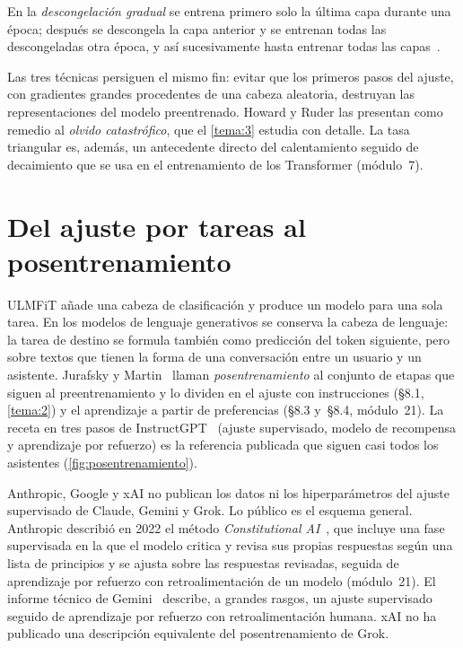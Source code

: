 \begin{definicion}\label{def:descongelacion}
En la \emph{descongelación gradual} se entrena primero solo la última capa durante una época; después se descongela la capa anterior y se entrenan todas las descongeladas otra época, y así sucesivamente hasta entrenar todas las capas~\cite[§3.3]{howard-ruder}.
\end{definicion}

\addtocounter{definicion}{1}%

\begin{observacion}
Las tres técnicas persiguen el mismo fin: evitar que los primeros pasos del ajuste, con gradientes grandes procedentes de una cabeza aleatoria, destruyan las representaciones del modelo preentrenado. Howard y Ruder las presentan como remedio al \emph{olvido catastrófico}, que el \cref{tema:3} estudia con detalle. La tasa triangular es, además, un antecedente directo del calentamiento seguido de decaimiento que se usa en el entrenamiento de los Transformer (módulo~7).
\end{observacion}

\section{Del ajuste por tareas al posentrenamiento}

ULMFiT añade una cabeza de clasificación y produce un modelo para una sola tarea. En los modelos de lenguaje generativos se conserva la cabeza de lenguaje: la tarea de destino se formula también como predicción del token siguiente, pero sobre textos que tienen la forma de una conversación entre un usuario y un asistente. Jurafsky y Martin~\cite[cap.~8]{jm3} llaman \emph{posentrenamiento} al conjunto de etapas que siguen al preentrenamiento y lo dividen en el ajuste con instrucciones (§8.1, \cref{tema:2}) y el aprendizaje a partir de preferencias (§8.3 y~§8.4, módulo~21). La receta en tres pasos de InstructGPT~\cite{ouyang} (ajuste supervisado, modelo de recompensa y aprendizaje por refuerzo) es la referencia publicada que siguen casi todos los asistentes (\cref{fig:posentrenamiento}).

\addtocounter{figure}{1}%

\begin{observacion}
Anthropic, Google y xAI no publican los datos ni los hiperparámetros del ajuste supervisado de Claude, Gemini y Grok. Lo público es el esquema general. Anthropic describió en 2022 el método \emph{Constitutional AI}~\cite{bai-cai}, que incluye una fase supervisada en la que el modelo critica y revisa sus propias respuestas según una lista de principios y se ajusta sobre las respuestas revisadas, seguida de aprendizaje por refuerzo con retroalimentación de un modelo (módulo~21). El informe técnico de Gemini~\cite[§6.3]{gemini} describe, a grandes rasgos, un ajuste supervisado seguido de aprendizaje por refuerzo con retroalimentación humana. xAI no ha publicado una descripción equivalente del posentrenamiento de Grok.
\end{observacion}

